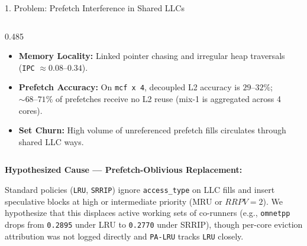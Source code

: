 \documentclass[aspectratio=169, 10pt]{beamer}
\begin{document}
\begin{frame}{1. Problem: Prefetch Interference in Shared LLCs}
\begin{columns}[t, onlytextwidth]
\begin{column}{0.485\textwidth}
\begin{tcolorbox}[archpanel]
\begin{itemize}
          \item \textbf{Memory Locality:} Linked pointer chasing and irregular heap traversals (\texttt{IPC} $\approx 0.08\text{--}0.34$).
          \item \textbf{Prefetch Accuracy:} On \texttt{mcf x 4}, decoupled L2 accuracy is $29\text{--}32\%$; $\sim 68\text{--}71\%$ of prefetches receive no L2 reuse (mix-1 is aggregated across 4 cores).
          \item \textbf{Set Churn:} High volume of unreferenced prefetch fills circulates through shared LLC ways.
        \end{itemize}
      \end{tcolorbox}
    \end{column}
  \end{columns}

  \vspace{0.22cm}
  \begin{tcolorbox}[summarystrip]
    {\footnotesize\textbf{\color{NavyPrimary}Hypothesized Cause --- Prefetch-Oblivious Replacement:}}\par\vspace{0.06cm}
    \scriptsize
    Standard policies (\texttt{LRU}, \texttt{SRRIP}) ignore \texttt{access\_type} on LLC fills and insert speculative blocks at high or intermediate priority (MRU or $RRPV=2$). We hypothesize that this displaces active working sets of co-runners (e.g., \texttt{omnetpp} drops from \texttt{0.2895} under LRU to \texttt{0.2770} under SRRIP), though per-core eviction attribution was not logged directly and \texttt{PA-LRU} tracks \texttt{LRU} closely.
  \end{tcolorbox}
\end{frame}
\end{document}
